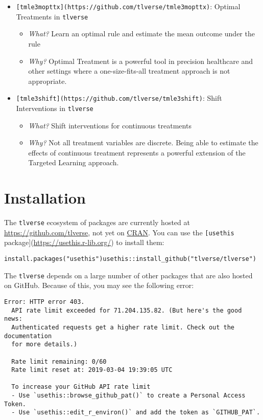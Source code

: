 \documentclass[
  12pt, krantz2,
]{krantz}
\newcommand{\passthrough}[1]{#1}
\providecommand{\tightlist}{%
  \setlength{\itemsep}{0pt}\setlength{\parskip}{0pt}}
\theoremstyle{definition}
\theoremstyle{definition}
\theoremstyle{definition}
\newcommand{\1}{\mathbbm{1}}
\begin{document}
\begin{itemize}
\tightlist
\item
  \passthrough{\lstinline![tmle3mopttx](https://github.com/tlverse/tmle3mopttx)!}: Optimal Treatments in \passthrough{\lstinline!tlverse!}

  \begin{itemize}
  \tightlist
  \item
    \emph{What?} Learn an optimal rule and estimate the mean outcome under the rule
  \item
    \emph{Why?} Optimal Treatment is a powerful tool in precision healthcare and other settings where a one-size-fits-all treatment approach is not appropriate.
  \end{itemize}
\item
  \passthrough{\lstinline![tmle3shift](https://github.com/tlverse/tmle3shift)!}: Shift Interventions in \passthrough{\lstinline!tlverse!}

  \begin{itemize}
  \tightlist
  \item
    \emph{What?} Shift interventions for continuous treatments
  \item
    \emph{Why?} Not all treatment variables are discrete. Being able to estimate the effects of continuous treatment represents a powerful extension of the Targeted Learning approach.
  \end{itemize}
\end{itemize}

\hypertarget{installation}{%
\section{Installation}\label{installation}}

The \passthrough{\lstinline!tlverse!} ecosystem of packages are currently hosted at \url{https://github.com/tlverse}, not yet on \href{https://cran.r-project.org/}{CRAN}. You can use the \passthrough{\lstinline![usethis!} package{]}(\url{https://usethis.r-lib.org/}) to install them:

\begin{lstlisting}
install.packages("usethis")usethis::install_github("tlverse/tlverse")
\end{lstlisting}

The \passthrough{\lstinline!tlverse!} depends on a large number of other packages that are also hosted on GitHub. Because of this, you may see the following error:

\begin{lstlisting}
Error: HTTP error 403.
  API rate limit exceeded for 71.204.135.82. (But here's the good news:
  Authenticated requests get a higher rate limit. Check out the documentation
  for more details.)

  Rate limit remaining: 0/60
  Rate limit reset at: 2019-03-04 19:39:05 UTC

  To increase your GitHub API rate limit
  - Use `usethis::browse_github_pat()` to create a Personal Access Token.
  - Use `usethis::edit_r_environ()` and add the token as `GITHUB_PAT`.
\end{lstlisting}
\end{document}
